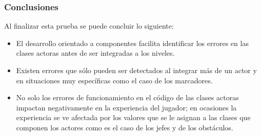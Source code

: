 \subsubsection{Conclusiones}
Al finalizar esta prueba se puede concluir lo siguiente:
\begin{itemize}
    \item El desarrollo orientado a componentes facilita identificar los errores en
    las clases actoras antes de ser integradas a los niveles.
    \item Existen errores que sólo pueden ser detectados al integrar más de un actor
    y en situaciones muy específicas como el caso de los marcadores.
    \item No solo los errores de funcionamiento en el código de las clases actoras
    impactan negativamente en la experiencia del jugador; en ocasiones la experiencia
    se ve afectada por los valores que se le asignan a las clases que componen los
    actores como es el caso de los jefes y de los obstáculos.
\end{itemize} 